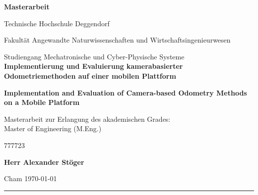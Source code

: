\begin{titlepage}
    \centering

      \Large
      \vspace{5cm}
   
      \textbf{Masterarbeit}
    
		\linespread{2}   
		   
      	\normalsize Technische Hochschule Deggendorf\\ 
      	\linespread{2}
      	
      	\normalsize Fakult\"at Angewandte Naturwissenschaften und Wirtschaftsingenieurwesen\\
      	\linespread{2}
      	
      	\normalsize Studiengang Mechatronische und Cyber-Physische Systeme\\
      	
	      
	  	\Large
	  	\vspace{0.5cm}
	  \textbf{Implementierung und Evaluierung kamerabasierter Odometriemethoden auf einer mobilen Plattform}
	  \vspace{0.5cm}
	  
	  
	  \textbf{Implementation and Evaluation of Camera-based Odometry Methods on a Mobile Platform}
	  \vspace{1cm}
  
      \normalsize Masterarbeit zur Erlangung des akademischen Grades:\\
      \normalsize Master of Engineering (M.Eng.)
      
      \vspace{1.0cm}
        {777723}{}

                              \textbf{Herr Alexander St\"oger }

      \vspace{\fill}
      
      \normalsize Cham \today
      
      \rule{\textwidth}{.5pt}
      
\end{titlepage}